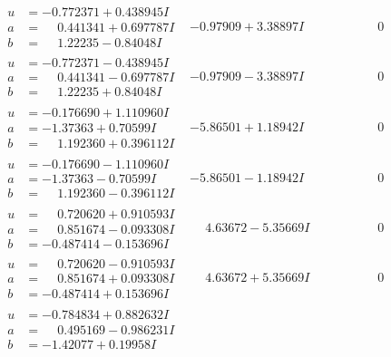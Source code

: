 \documentclass[1p]{elsarticle_modified}
\theoremstyle{definition}
\begin{document}
$$\begin{array}{c|c|c}
\begin{aligned}
u &= -0.772371 + 0.438945 I \\
a &= \phantom{-}0.441341 + 0.697787 I \\
b &= \phantom{-}1.22235 - 0.84048 I\end{aligned}
 & -0.97909 + 3.38897 I & \phantom{-0.000000 } 0 \\ \hline\begin{aligned}
u &= -0.772371 - 0.438945 I \\
a &= \phantom{-}0.441341 - 0.697787 I \\
b &= \phantom{-}1.22235 + 0.84048 I\end{aligned}
 & -0.97909 - 3.38897 I & \phantom{-0.000000 } 0 \\ \hline\begin{aligned}
u &= -0.176690 + 1.110960 I \\
a &= -1.37363 + 0.70599 I \\
b &= \phantom{-}1.192360 + 0.396112 I\end{aligned}
 & -5.86501 + 1.18942 I & \phantom{-0.000000 } 0 \\ \hline\begin{aligned}
u &= -0.176690 - 1.110960 I \\
a &= -1.37363 - 0.70599 I \\
b &= \phantom{-}1.192360 - 0.396112 I\end{aligned}
 & -5.86501 - 1.18942 I & \phantom{-0.000000 } 0 \\ \hline\begin{aligned}
u &= \phantom{-}0.720620 + 0.910593 I \\
a &= \phantom{-}0.851674 - 0.093308 I \\
b &= -0.487414 - 0.153696 I\end{aligned}
 & \phantom{-}4.63672 - 5.35669 I & \phantom{-0.000000 } 0 \\ \hline\begin{aligned}
u &= \phantom{-}0.720620 - 0.910593 I \\
a &= \phantom{-}0.851674 + 0.093308 I \\
b &= -0.487414 + 0.153696 I\end{aligned}
 & \phantom{-}4.63672 + 5.35669 I & \phantom{-0.000000 } 0 \\ \hline\begin{aligned}
u &= -0.784834 + 0.882632 I \\
a &= \phantom{-}0.495169 - 0.986231 I \\
b &= -1.42077 + 0.19958 I\end{aligned}

\end{array}$$
\end{document}
